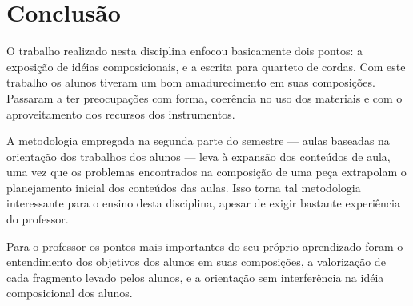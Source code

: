 \documentclass[12pt]{article}
\begin{document}
\section{Conclusão}
\label{sec:conclusao}

O trabalho realizado nesta disciplina enfocou basicamente dois pontos:
a exposição de idéias composicionais, e a escrita para quarteto de
cordas. Com este trabalho os alunos tiveram um bom amadurecimento em
suas composições. Passaram a ter preocupações com forma, coerência no
uso dos materiais e com o aproveitamento dos recursos dos
instrumentos.

A metodologia empregada na segunda parte do semestre --- aulas
baseadas na orientação dos trabalhos dos alunos --- leva à expansão
dos conteúdos de aula, uma vez que os problemas encontrados na
composição de uma peça extrapolam o planejamento inicial dos conteúdos
das aulas. Isso torna tal metodologia interessante para o ensino desta
disciplina, apesar de exigir bastante experiência do professor.

Para o professor os pontos mais importantes do seu próprio aprendizado
foram o entendimento dos objetivos dos alunos em suas composições, a
valorização de cada fragmento levado pelos alunos, e a orientação sem
interferência na idéia composicional dos alunos.

\renewcommand{\refname}{Bibliografia}

\nocite{Beethoven1970,Heussenstamm1987,adler89:_study_orches,Kennan1997,stone80:_music_notat_twent_centur,casella50:_la}



\end{document}

